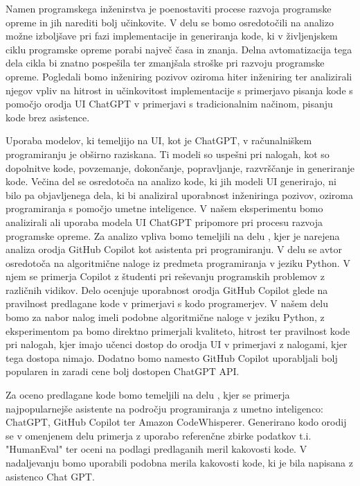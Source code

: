 \documentclass[a4paper,12pt,openright]{book}
\begin{document}
Namen programskega inženirstva je poenostaviti procese razvoja programske opreme in jih narediti bolj učinkovite. 
V delu se bomo osredotočili na analizo možne izboljšave pri fazi implementacije in generiranja kode, ki v življenjskem ciklu programske opreme porabi največ časa in znanja. Delna avtomatizacija tega dela cikla bi znatno pospešila ter zmanjšala stroške pri razvoju programske opreme. Pogledali bomo inženiring pozivov oziroma hiter inženiring ter analizirali njegov vpliv na hitrost in učinkovitost implementacije s primerjavo pisanja kode s pomočjo orodja UI ChatGPT v primerjavi s tradicionalnim načinom, pisanju kode brez asistence. 

Uporaba modelov, ki temeljijo na UI, kot je ChatGPT, v računalniškem programiranju je obširno raziskana. Ti modeli so uspešni pri nalogah, kot so dopolnitve kode, povzemanje, dokončanje, popravljanje, razvrščanje in generiranje kode. Večina del se osredotoča na analizo kode, ki jih modeli UI generirajo, ni bilo pa objavljenega dela, ki bi analiziral uporabnost inženiringa pozivov, oziroma programiranja s pomočjo umetne inteligence. V našem eksperimentu bomo analizirali ali uporaba modela UI ChatGPT pripomore pri procesu razvoja programske opreme.
\cite{rudolph2023war}
\newline
Za analizo vpliva bomo temeljili na delu \cite{MORADIDAKHEL2023111734}, kjer je narejena analiza orodja GitHub Copilot kot asistenta pri programiranju. V delu se avtor osredotoča na algoritmične naloge iz predmeta programiranja v jeziku Python. V njem se primerja Copilot z študenti pri reševanju programskih problemov z različnih vidikov. Delo ocenjuje uporabnost orodja GitHub Copilot glede na pravilnost predlagane kode v primerjavi s kodo programerjev.
V našem delu bomo za nabor nalog imeli podobne algoritmične naloge v jeziku Python, z eksperimentom pa bomo direktno primerjali kvaliteto, hitrost ter pravilnost kode pri nalogah, kjer imajo učenci dostop do orodja UI v primerjavi z nalogami, kjer tega dostopa nimajo. Dodatno bomo namesto GitHub Copilot uporabljali bolj popularen in zaradi cene bolj dostopen ChatGPT API. 

Za oceno predlagane kode bomo temeljili na delu \cite{yetistiren2023evaluating}, kjer se primerja najpopularnejše asistente na področju programiranja z umetno inteligenco: ChatGPT, GitHub Copilot ter Amazon CodeWhisperer. Generirano kodo orodij se v omenjenem delu primerja z uporabo referenčne zbirke podatkov t.i. "HumanEval" ter oceni na podlagi predlaganih meril kakovosti kode. V nadaljevanju bomo uporabili podobna merila kakovosti kode, ki je bila napisana z asistenco Chat GPT. 
\end{document}
